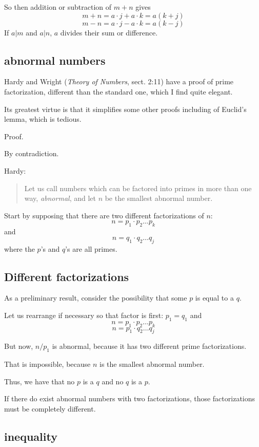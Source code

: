 \documentclass[11pt, oneside]{article}
\begin{document}
So then addition or subtraction of $m + n$ gives
\[ m + n = a \cdot j + a \cdot k = a(k + j) \]
\[ m - n = a \cdot j - a \cdot k = a(k - j) \]
If $a|m$ and $a|n$, $a$ divides their sum or difference.

\subsection*{abnormal numbers}

Hardy and Wright (\emph{Theory of Numbers}, sect. 2:11) have a proof of prime factorization, different than the standard one, which I find quite elegant.

Its greatest virtue is that it simplifies some other proofs including of Euclid's lemma, which is tedious.

Proof.

By contradiction.

Hardy:
\begin{quote}Let us call numbers which can be factored into primes in more than one way, \emph{abnormal}, and let $n$ be the smallest abnormal number.\end{quote}

Start by supposing that there are two different factorizations of $n$:
\[ n = p_1 \cdot p_2 \dots p_k \]
and
\[ n = q_1 \cdot q_2 \dots q_j \]
where the $p$'s and $q$'s are all primes.

\subsection*{Different factorizations}

As a preliminary result, consider the possibility that some $p$ is equal to a $q$.

Let us rearrange if necessary so that factor is first:  $p_1 = q_1$ and
\[ n = p_1 \cdot p_2 \dots p_k \]
\[ n = p_1 \cdot q_2 \dots q_j \]

But now, $n/p_1$ is abnormal, because it has two different prime factorizations.  

That is impossible, because $n$ is the smallest abnormal number.

Thus, we have that no $p$ is a $q$ and no $q$ is a $p$.

If there do exist abnormal numbers with two factorizations, those factorizations must be completely different.

\subsection*{inequality}
\end{document}

